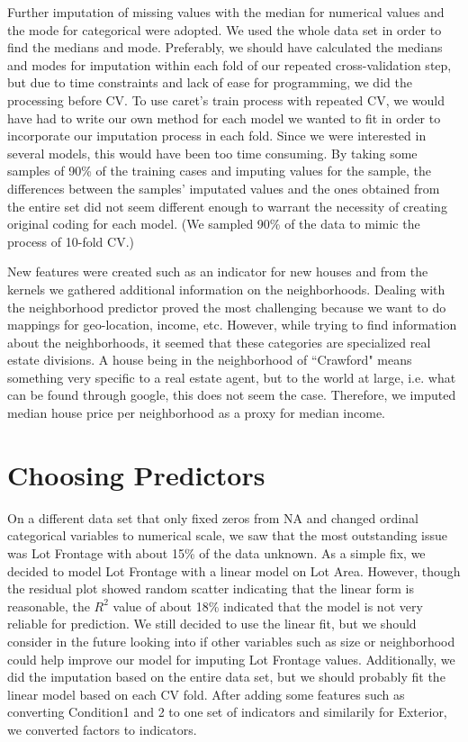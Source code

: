 \documentclass[12pt]{article}
\begin{document}
Further imputation of missing values with the median for numerical values and the mode for categorical were adopted.  We used the whole data set in order to find the medians and mode.  Preferably, we should have calculated the medians and modes for imputation within each fold of our repeated cross-validation step, but due to time constraints and lack of ease for programming, we did the processing before CV.  To use caret's train process with repeated CV, we would have had to write our own method for each model we wanted to fit in order to incorporate our imputation process in each fold.  Since we were interested in several models, this would have been too time consuming.  By taking some samples of 90\% of the training cases and imputing values for the sample, the differences between the samples' imputated values and the ones obtained from the entire set did not seem different enough to warrant the necessity of creating original coding for each model.  (We sampled 90\% of the data to mimic the process of 10-fold CV.)

New features were created such as an indicator for new houses and from the kernels we gathered additional information on the neighborhoods.  Dealing with the neighborhood predictor proved the most challenging because we want to do mappings for geo-location, income, etc.  However, while trying to find information about the neighborhoods, it seemed that these categories are specialized real estate divisions.  A house being in the neighborhood of ``Crawford" means something very specific to a real estate agent, but to the world at large, i.e. what can be found through google, this does not seem the case.  Therefore, we imputed median house price per neighborhood as a proxy for median income.


\section{Choosing Predictors}

On a different data set that only fixed zeros from NA and changed ordinal categorical variables to numerical scale, we saw that the most outstanding issue was Lot Frontage with about 15\% of the data unknown.  As a simple fix, we decided to model Lot Frontage with a linear model on Lot Area.  However, though the residual plot showed random scatter indicating that the linear form is reasonable, the $R^2$ value of about 18\% indicated that the model is not very reliable for prediction.  We still decided to use the linear fit, but we should consider in the future looking into if other variables such as size or neighborhood could help improve our model for imputing Lot Frontage values. Additionally, we did the imputation based on the entire data set, but we should probably fit the linear model based on each CV fold.  After adding some features such as converting Condition1 and 2 to one set of indicators and similarily for Exterior, we converted factors to indicators.
\end{document}
